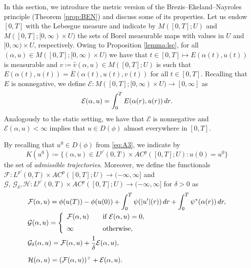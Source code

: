 \documentclass[10pt,a4paper]{amsart}
\newcommand{\disp}{\displaystyle}
\newcommand{\dr}{{\rm d} r}
\newcommand{\ove}{\overline}
\newcommand{\haz}{\widehat}
\newcommand{\GG}{{\mathcal G}}
\newcommand{\EE}{{\mathcal E}}
\newcommand{\FF}{{\mathcal F}}
\newcommand{\HH}{{\mathcal H}}
\begin{document}
 In this section, we introduce the metric version of the
Brezis--Ekeland--Nayroles principle (Theorem \ref{prop:BEN}) and discuss some of its
properties. Let us   endow $[0,T]$ with the Lebesgue measure and indicate
  by $M([0,T]; U)$ and $M([0,T];[0,\infty)\times U)$  the sets of Borel
  measurable maps with values in $U$ and $[0,\infty) \times U$, respectively. Owing to
  Proposition \ref{lemma:lsc}, for all $(\alpha,u) \in
  M([0,T];[0,\infty)\times U)$ we have that $t \in [0,T]\mapsto  
  E(\alpha(t),u(t))$ is measurable and $ v\coloneqq\haz v(\alpha,u) \in
  M([0,T];U)$ is such that $
  E(\alpha(t),u(t))= \ove E(\alpha(t),u(t), v (t))$ for all $t \in
  [0,T]$. Recalling that $ E $  is nonnegative,  we  define $ \EE: M([0,T];[0,\infty) \times
 U) \to [0,\infty]$ as
  $$ \EE(\alpha,u) = 
  \disp\int_0^T E(\alpha(r),u(r))\, \dr.$$
Analogously to the static setting,  we have that $\EE $  is
nonnegative and  
$\EE(\alpha,u) < \infty$ implies that $u  \in D(\phi)$ almost
everywhere in 
$[0,T]$. 


By recalling that $u^0 \in D(\phi)$ from
\eqref{eq:A3}, we indicate by 
\begin{equation}
  \label{eq:K}
  K(u^0)\coloneqq\{(\alpha,u)\in L^{p'}(0,T)\times AC^p([0,T];U) : u(0)=u^0\}
\end{equation}
the set of {\it admissible trajectories}. Moreover, we define the functionals $\FF: L^{p'}(0,T)\times
AC^p([0,T];U) \to (-\infty,\infty]$ and $\GG,\, 
\GG_\delta,  \HH : L^{p'}(0,T)\times
AC^p([0,T];U)\to (-\infty,\infty]$ for $\delta>0$ as
\begin{align*}
   &\FF(\alpha,u) = 
     \phi(u(T))-\phi(u(0)) + \int_0^T\psi(
       |u'|(r))\, \dr +  \int_0^T \psi^*(\alpha (r))\, \dr , \\
   & \GG(\alpha,u) =
     \left\{
     \begin{array}{ll}
       \FF(\alpha,u) \quad&\text{if} \ \EE (\alpha,u)=0,\\[2mm]
       \infty&\text{otherwise},
     \end{array}
               \right. \\
  &\GG_\delta(\alpha,u) = \FF(\alpha,u) + \frac1\delta \EE(\alpha,u),\\[2mm]
  & \HH(\alpha,u) = (\FF(\alpha,u))^+ + \EE(\alpha,u).
\end{align*}
\end{document}
